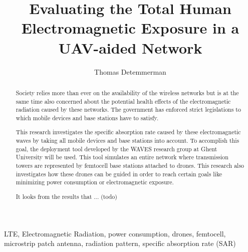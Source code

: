 \documentclass[twocolumn]{phdsymp} %
\begin{document}
\title{Evaluating the Total Human Electromagnetic Exposure in a UAV-aided Network}

\author{Thomas Detemmerman}


\maketitle

\begin{abstract}
Society relies more than ever on the availability of the wireless networks but is at the same time also 
concerned about the potential health effects of the electromagnetic radiation caused by these networks.
The government has enforced strict legislations to which mobile devices and base stations have to satisfy.

This research investigates the specific absorption rate caused by these electromagnetic waves by taking all mobile devices and base stations into account.
To accomplish this goal, the deployment tool developed by the WAVES research group at Ghent University will be used. This tool simulates an entire network 
where transmission towers are represented by femtocell base stations attached to drones. This research also investigates how these drones can be guided 
in order to reach certain goals like minimizing power consumption or electromagnetic exposure.

It looks from the results that ... (todo)
\end{abstract}

\begin{keywords}
LTE, Electromagnetic Radiation, power consumption, drones, femtocell, microstrip patch antenna, radiation pattern, specific absorption rate (SAR)
\end{keywords}
\end{document}
